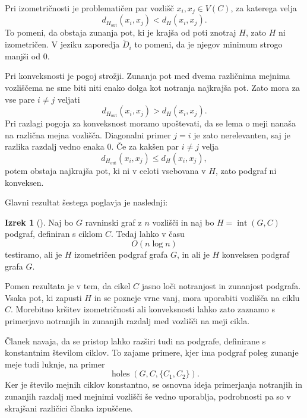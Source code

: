 \documentclass[sigconf
]{acmart}
\theoremstyle{definition}
\newtheorem{theorem}{Izrek}[section]
\begin{document}
Pri izometričnosti je problematičen par vozlišč $x_i,x_j \in V(C)$, za katerega velja
\begin{equation}
    d_{H_{\mathrm{out}}}(x_i,x_j) < d_H(x_i,x_j).
\end{equation}
To pomeni, da obstaja zunanja pot, ki je krajša od poti znotraj $H$, zato $H$ ni izometričen. V jeziku zaporedja $\tilde{D}_i$ to pomeni, da je njegov minimum strogo manjši od $0$.

Pri konveksnosti je pogoj strožji. Zunanja pot med dvema različnima mejnima vozliščema ne sme biti niti enako dolga kot notranja najkrajša pot. Zato mora za vse pare $i\neq j$ veljati
\begin{equation}
    d_{H_{\mathrm{out}}}(x_i,x_j) > d_H(x_i,x_j).
\end{equation}
Pri razlagi pogoja za konveksnost moramo upoštevati, da se lema o meji nanaša na različna mejna vozlišča. Diagonalni primer $j=i$ je zato nerelevanten, saj je razlika razdalj vedno enaka $0$. Če za kakšen par $i\neq j$ velja
\begin{equation}
    d_{H_{\mathrm{out}}}(x_i,x_j) \leq d_H(x_i,x_j),
\end{equation}
potem obstaja najkrajša pot, ki ni v celoti vsebovana v $H$, zato podgraf ni konveksen.

Glavni rezultat šestega poglavja je naslednji:

\begin{theorem}[\cite{main_paper}]
Naj bo $G$ ravninski graf z $n$ vozlišči in naj bo $H=\operatorname{int}(G,C)$ podgraf, definiran s ciklom $C$. Tedaj lahko v času
\begin{equation}
    O(n \log n)
\end{equation}
testiramo, ali je $H$ izometričen podgraf grafa $G$, in ali je $H$ konveksen podgraf grafa $G$.
\end{theorem}

Pomen rezultata je v tem, da cikel $C$ jasno loči notranjost in zunanjost podgrafa. Vsaka pot, ki zapusti $H$ in se pozneje vrne vanj, mora uporabiti vozlišča na ciklu $C$. Morebitno kršitev izometričnosti ali konveksnosti lahko zato zaznamo s primerjavo notranjih in zunanjih razdalj med vozlišči na meji cikla.

Članek navaja, da se pristop lahko razširi tudi na podgrafe, definirane s konstantnim številom ciklov. To zajame primere, kjer ima podgraf poleg zunanje meje tudi luknje, na primer
\begin{equation}
    \operatorname{holes}(G,C,\{C_1,C_2\}).
\end{equation}
Ker je število mejnih ciklov konstantno, se osnovna ideja primerjanja notranjih in zunanjih razdalj med mejnimi vozlišči še vedno uporablja, podrobnosti pa so v skrajšani različici članka izpuščene.
\end{document}
